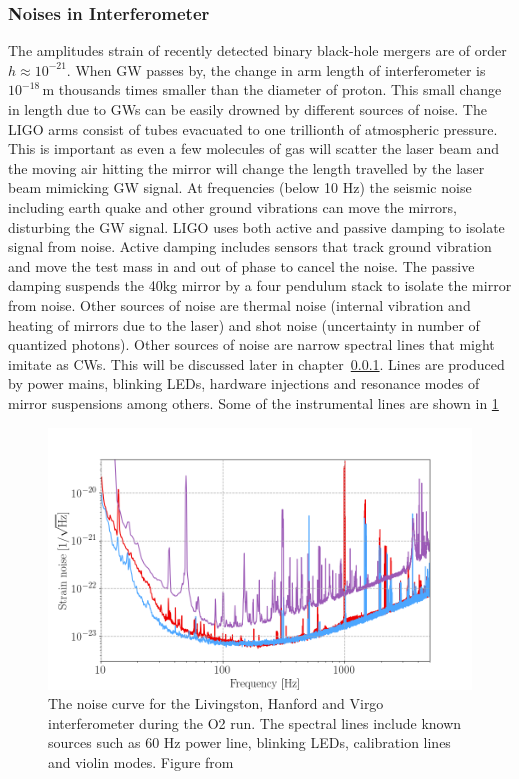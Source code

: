 \documentclass{ttuthes2007}
\begin{document}
\subsubsection{Noises in Interferometer}

The amplitudes strain of recently detected binary black-hole mergers are
of order $h \approx10^{-21}$. When \ac{GW} passes by, the change in arm length of
interferometer is $10^{-18}$\,m thousands times smaller than the diameter of proton. This small
change in length due to \acp{GW} can be easily drowned by different sources of
noise. The LIGO arms consist of tubes evacuated to one trillionth of
atmospheric pressure. This is important as even a few molecules of gas will
scatter the laser beam and the moving air hitting the mirror will change the
length travelled by the laser beam mimicking \ac{GW} signal.
 At frequencies (below 10 Hz) the seismic noise including earth
quake and other ground vibrations can move the mirrors, disturbing the \ac{GW}
signal. LIGO uses both active and passive damping to isolate signal from noise.
Active damping includes sensors that track ground vibration and move the
test mass in and out of phase to cancel the noise. The passive damping suspends the
40kg mirror by a four pendulum stack to isolate the mirror from noise. Other sources of
noise are thermal noise (internal vibration and heating of mirrors due to the laser)
and shot noise (uncertainty in number of quantized photons). 
Other sources of noise are narrow spectral lines that might imitate as \acp{CW}.
This will be discussed later in chapter~\ref{}. Lines are produced by power
mains, blinking LEDs, hardware injections and resonance modes of mirror
suspensions among others. Some of the instrumental lines are shown in \ref{fig:CWnoise}
\begin{figure}[bht!]
	\includegraphics[width=\textwidth]{figure/CWnoise.png}
	\caption{The noise curve for the Livingston, Hanford and Virgo
interferometer during the \ac{O2} run. The spectral lines include known sources such as
60 Hz power line, blinking LEDs, calibration lines and violin modes. Figure from
~\cite{Abbott_2019} }
	\label{fig:CWnoise}
\end{figure}
\end{document}
